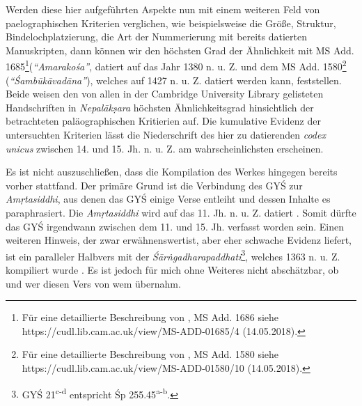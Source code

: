 \documentclass[a4paper,12pt]{article}
\begin{document}
{Werden diese hier aufgeführten Aspekte nun mit einem weiteren Feld von paelographischen Kriterien verglichen, wie beispielsweise die Größe, Struktur, Bindelochplatzierung, die Art der Nummerierung mit bereits datierten Manuskripten, dann können wir den höchsten Grad der Ähnlichkeit mit MS Add. 1685\footnote{\raggedright{Für eine detaillierte Beschreibung von \textcite{amara}, MS Add. 1686 siehe https://cudl.lib.cam.ac.uk/view/MS-ADD-01685/4 (14.05.2018).}}(\textit{``Amarakośa''}, datiert auf das Jahr 1380 n. u. Z. und dem MS Add. 1580\footnote{\raggedright{Für eine detaillierte Beschreibung von \textcite{shambuvadana}, MS Add. 1580 siehe https://cudl.lib.cam.ac.uk/view/MS-ADD-01580/10 (14.05.2018).}} (\textit{``Śambūkāvadāna''}), welches auf 1427 n. u. Z. datiert werden kann, feststellen. Beide weisen den von allen in der Cambridge University Library gelisteten Handschriften in \textit{Nepalākṣara} höchsten Ähnlichkeitsgrad hinsichtlich der betrachteten paläographischen Kritierien auf. Die kumulative Evidenz der untersuchten Kriterien lässt die Niederschrift des hier zu datierenden \textit{codex unicus} zwischen 14. und 15. Jh. n. u. Z. am wahrscheinlichsten erscheinen. 

Es ist nicht auszuschließen, dass die Kompilation des Werkes hingegen bereits vorher stattfand. Der primäre Grund ist die Verbindung des GYŚ zur \textit{Amṛtasiddhi}, aus denen das GYŚ einige Verse entleiht und dessen Inhalte es paraphrasiert. Die \textit{Amṛtasiddhi} wird auf das 11. Jh. n. u. Z. datiert \parencite[2]{mallinson2016as}. Somit dürfte das GYŚ irgendwann zwischen dem 11. und 15. Jh. verfasst worden sein. Einen weiteren Hinweis, der zwar erwähnenswertist, aber eher schwache Evidenz liefert, ist ein paralleler Halbvers mit der \textit{Śārṅgadharapaddhati}\footnote{GYŚ 21\textsuperscript{c-d} entspricht Śp 255.45\textsuperscript{a-b}.}, welches 1363 n. u. Z. kompiliert wurde \parencite[18]{olesen2016}. Es ist jedoch für mich ohne Weiteres nicht abschätzbar, ob und wer diesen Vers von wem übernahm.



}
\end{document}
